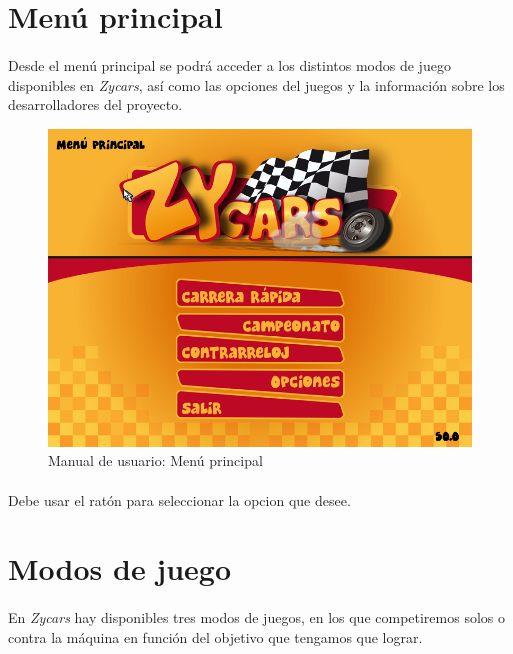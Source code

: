 \section{Menú principal}

\paragraph{}
Desde el menú principal se podrá acceder a los distintos modos de juego disponibles en \emph{Zycars}, así
como las opciones del juegos y la información sobre los desarrolladores del proyecto.

\begin{figure}[H]
  \label{menu_princiapl}
  \begin{center}
    \includegraphics[scale=0.4]{imagenes/capturas/menuprincipal.png}
  \end{center}
  \caption{Manual de usuario: Menú principal}
\end{figure}

\paragraph{}
Debe usar el ratón para seleccionar la opcion que desee.

\section{Modos de juego}

\paragraph{}
En \emph{Zycars} hay disponibles tres modos de juegos, en los que competiremos solos o contra la máquina en función
del objetivo que tengamos que lograr.

